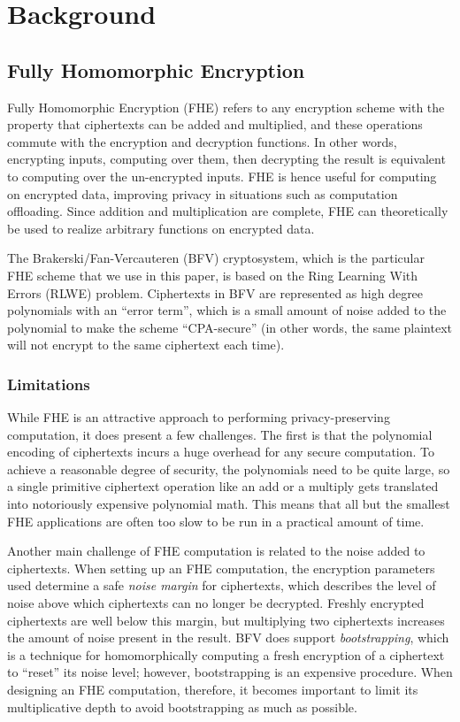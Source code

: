 \section{Background}\label{sec:background}
\subsection{Fully Homomorphic Encryption}
Fully Homomorphic Encryption (FHE) refers to any encryption scheme with the property that ciphertexts can be added and multiplied, and these operations commute with the encryption and decryption functions. \cite{Gentry}
In other words, encrypting inputs, computing over them, then decrypting the result is equivalent to computing over the un-encrypted inputs. FHE is hence useful for computing on encrypted data, improving privacy in situations such as computation offloading.
Since addition and multiplication are complete, FHE can theoretically be used to realize arbitrary functions on encrypted data.

The Brakerski/Fan-Vercauteren (BFV) \cite{BFV} cryptosystem, which is the particular FHE scheme that we use in this paper, is based on the Ring Learning With Errors (RLWE) problem.
Ciphertexts in BFV are represented as high degree polynomials with an ``error term'', which is a small amount of noise added to the polynomial to make the scheme ``CPA-secure'' (in other words, the same plaintext will not encrypt to the same ciphertext each time).
\subsubsection{Limitations}
While FHE is an attractive approach to performing privacy-preserving computation, it does present a few challenges.
The first is that the polynomial encoding of ciphertexts incurs a huge overhead for any secure computation.
To achieve a reasonable degree of security, the polynomials need to be quite large, so a single primitive ciphertext operation like an add or a multiply gets translated into notoriously expensive polynomial math.
This means that all but the smallest FHE applications are often too slow to be run in a practical amount of time.

Another main challenge of FHE computation is related to the noise added to ciphertexts.
When setting up an FHE computation, the encryption parameters used determine a safe {\em noise margin} for ciphertexts, which describes the level of noise above which ciphertexts can no longer be decrypted.
Freshly encrypted ciphertexts are well below this margin, but multiplying two ciphertexts increases the amount of noise present in the result.
BFV does support {\em bootstrapping}, which is a technique for homomorphically computing a fresh encryption of a ciphertext to ``reset'' its noise level; however, bootstrapping is an expensive procedure.
When designing an FHE computation, therefore, it becomes important to limit its multiplicative depth to avoid bootstrapping as much as possible.

